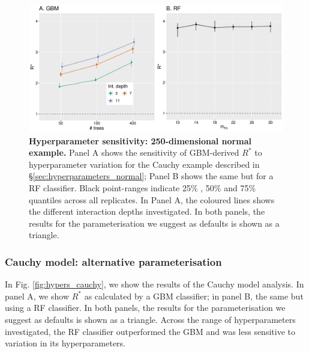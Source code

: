 \documentclass[ba]{imsart}
\numberwithin{equation}{section}
\theoremstyle{plain}
\begin{document}
\begin{supplement}
		\begin{figure}[!htb]
			\centerline{\includegraphics[width=1.0\textwidth]{hypers_normal_250.pdf}}
			\caption{\textbf{Hyperparameter sensitivity: 250-dimensional normal example.} Panel A shows the sensitivity of GBM-derived $R^*$ to hyperparameter variation for the Cauchy example described in \S\ref{sec:hyperparameters_normal}; Panel B shows the same but for a RF classifier. Black point-ranges indicate 25\% , 50\% and 75\% quantiles across all replicates. In Panel A, the coloured lines shows the different interaction depths investigated. In both panels, the results for the parameterisation we suggest as defaults is shown as a triangle.}
			\label{fig:hypers_normal}
		\end{figure}
		
		
		\subsubsection{Cauchy model: alternative parameterisation}\label{sec:hyperparameters_cauchy}
		In Fig. \ref{fig:hypers_cauchy}, we show the results of the Cauchy model analysis. In panel A, we show $R^*$ as calculated by a GBM classifier; in panel B, the same but using a RF classifier. In both panels, the results for the parameterisation we suggest as defaults is shown as a triangle. Across the range of hyperparameters investigated, the RF classifier outperformed the GBM and was less sensitive to variation in its hyperparameters.
		

\end{supplement}
\end{document}

